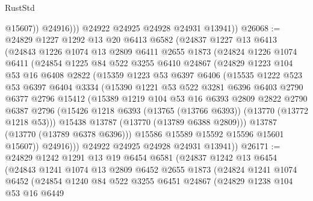 \begin{lexlean}{RustStd}
\begin{coremodule}
                  @15607))
              @24916)))
        @24922
        @24925
        @24928
        @24931
        @13941))
@26068 := @24829
    @1227
    @1292
    @13
    @20
    @6413
    @6582
    (@24837
      @1227
      @13
      @6413
      (@24843
        @1226
        @1074
        @13
        @2809
        @6411
        @2655
        @1873
        (@24824
          @1226
          @1074
          @6411
          (@24854
            @1225
            @84
            @522
            @3255
            @6410
            @24867
            (@24829
              @1223
              @104
              @53
              @16
              @6408
              @2822
              (@15359
                @1223
                @53
                @6397
                @6406
                (@15535
                  @1222
                  @523
                  @53
                  @6397
                  @6404
                  @3334
                  (@15390
                    @1221
                    @53
                    @522
                    @3281
                    @6396
                    @6403
                    @2790
                    @6377
                    @2796
                    @15412
                    (@15389
                      @1219
                      @104
                      @53
                      @16
                      @6393
                      @2809
                      @2822
                      @2790
                      @6387
                      @2796
                      (@15426 @1218 @6393 (@13765 (@13766 @6393)) (@13770 (@13772 @1218 @53)))
                      @15438
                      @13787
                      (@13770 (@13789 @6388 @2809)))
                    @13787
                    (@13770 (@13789 @6378 @6396)))
                  @15586
                  @15589
                  @15592
                  @15596
                  @15601
                  @15607))
              @24916)))
        @24922
        @24925
        @24928
        @24931
        @13941))
@26171 := @24829
    @1242
    @1291
    @13
    @19
    @6454
    @6581
    (@24837
      @1242
      @13
      @6454
      (@24843
        @1241
        @1074
        @13
        @2809
        @6452
        @2655
        @1873
        (@24824
          @1241
          @1074
          @6452
          (@24854
            @1240
            @84
            @522
            @3255
            @6451
            @24867
            (@24829
              @1238
              @104
              @53
              @16
              @6449

\end{coremodule}
\end{lexlean}

